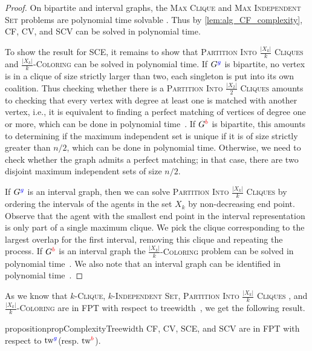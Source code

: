 \documentclass[a4paper,fleqn]{cas-sc}
\newcommand{\friendshipColor}{blue}
\newcommand{\enemyColor}{red}
\newcommand{\agents}{agents\xspace}
\newcommand{\nbAgents}{\ensuremath{n}\xspace}
\newcommand{\agentSetInMaxCoalition}{\ensuremath{X}\xspace}
\newcommand{\friendSuperscript}{{\color{\friendshipColor}g}}
\newcommand{\enemySuperscript}{{\color{\enemyColor}b}}
\newcommand{\friendshipGraph}{\ensuremath{G^{\friendSuperscript}}\xspace}
\newcommand{\enemyGraph}{\ensuremath{G^{\enemySuperscript}}\xspace}
\newcommand{\probname}[1]{\textsc{#1}}
\newcommand{\maxclique}{\probname{Max Clique}\xspace}
\newcommand{\maxIS}{\probname{Max Independent Set}\xspace}
\newcommand{\kclique}[1]{\probname{#1-Clique}\xspace}
\newcommand{\kIS}[1]{\probname{#1-Independent Set}\xspace}
\newcommand{\partitionIntokCliques}[1]{\probname{Partition Into #1 Cliques} \xspace}
\newcommand{\kColouring}[1]{\probname{#1-Coloring}\xspace}
\newcommand{\SCE}{SCE\xspace}
\newcommand{\SCV}{SCV\xspace}
\newcommand{\CF}{CF\xspace}
\newcommand{\CV}{CV\xspace}
\newcommand{\treewidth}{\ensuremath{\text{tw}}}
\newcommand{\treewidthFriend}{\ensuremath{\treewidth^{\friendSuperscript}}\xspace}
\newcommand{\treewidthEnemy}{\ensuremath{\treewidth^{\enemySuperscript}}\xspace}
\newcommand{\appsymb}{$\star$}
\begin{document}
\begin{proof}
On bipartite and interval graphs, the \maxclique and \maxIS problems are polynomial time solvable \cite{mohring1985algorithmic}. Thus by \cref{lem:alg_CF_complexity}, \CF, \CV, and \SCV can be solved in polynomial time. 

To show the result for \SCE,
it remains to show that \partitionIntokCliques{$\frac{|\agentSetInMaxCoalition_k|}{k}$} and \kColouring{$\frac{|\agentSetInMaxCoalition_k|}{k}$} can be solved in polynomial time.
If \friendshipGraph is bipartite, no vertex is in a clique of size strictly larger than two, each singleton is put into its own coalition. Thus checking whether there is a \partitionIntokCliques{$\frac{|\agentSetInMaxCoalition_2|}{2}$} amounts to checking that every vertex with degree at least one is matched with another vertex, i.e., it is equivalent to finding a perfect matching of vertices of degree one or more, which can be done in polynomial time~\cite{kleinberg2014algorithm}.
If \enemyGraph is bipartite, this amounts to determining if the maximum independent set is unique if it is of size strictly greater than $\nbAgents/2$, which can be done in polynomial time. Otherwise, we need to check whether the graph admits a perfect matching; in that case, there are two disjoint maximum independent sets of size $\nbAgents/2$.

If \friendshipGraph is an interval graph, then we can solve \partitionIntokCliques{$\frac{|\agentSetInMaxCoalition_k|}{k}$} by ordering the intervals of the \agents in the set $\agentSetInMaxCoalition_k$ by non-decreasing end point. Observe that the agent with the smallest end point in the interval representation is only part of a single maximum clique. We pick the clique corresponding to the largest overlap for the first interval, removing this clique and repeating the process. If \enemyGraph is an interval graph the \kColouring{$\frac{|\agentSetInMaxCoalition_k|}{k}$} problem can be solved in polynomial time~\cite{cormen2022introduction}. We also note that an interval graph can be identified in polynomial time~\cite{booth1976testing}.
\end{proof}

As we know that \kclique{$k$}, \kIS{$k$}, \partitionIntokCliques{$\frac{|\agentSetInMaxCoalition_k|}{k}$}, and \kColouring{$\frac{|\agentSetInMaxCoalition_k|}{k}$} are in FPT with respect to treewidth~\cite{courcelle1993monadic}, we get the following result.


\begin{restatable}[\appsymb]{proposition}{propComplexityTreewidth}
\CF, \CV, \SCE, and \SCV are in FPT with respect to \treewidthFriend (resp. \treewidthEnemy).
\label{prop:TW_complexity}
\end{restatable}
\end{document}

